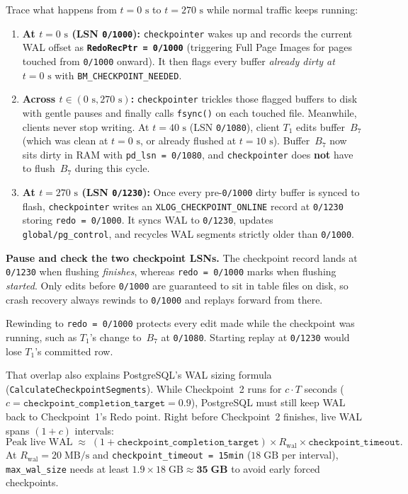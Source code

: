 Trace what happens from $t = 0\text{ s}$ to $t = 270\text{ s}$ while normal traffic keeps running:
\begin{enumerate}
  \item \textbf{At $t = 0\text{ s}$ (LSN \texttt{0/1000}):} \texttt{checkpointer} wakes up and records the current WAL offset as \textbf{\texttt{RedoRecPtr = 0/1000}} (triggering Full Page Images for pages touched from \texttt{0/1000} onward). It then flags every buffer \emph{already dirty at $t = 0\text{ s}$} with \texttt{BM\_CHECKPOINT\_NEEDED}.
  \item \textbf{Across $t \in (0\text{ s}, 270\text{ s})$:} \texttt{checkpointer} trickles those flagged buffers to disk with gentle pauses and finally calls \texttt{fsync()} on each touched file. Meanwhile, clients never stop writing. At $t = 40\text{ s}$ (LSN \texttt{0/1080}), client $T_1$ edits buffer~$B_7$ (which was clean at $t = 0\text{ s}$, or already flushed at $t = 10\text{ s}$). Buffer~$B_7$ now sits dirty in RAM with \texttt{pd\_lsn = 0/1080}, and \texttt{checkpointer} does \textbf{not} have to flush~$B_7$ during this cycle.
  \item \textbf{At $t = 270\text{ s}$ (LSN \texttt{0/1230}):} Once every pre-\texttt{0/1000} dirty buffer is synced to flash, \texttt{checkpointer} writes an \texttt{XLOG\_CHECKPOINT\_ONLINE} record at \texttt{0/1230} storing \texttt{redo = 0/1000}. It syncs WAL to \texttt{0/1230}, updates \texttt{global/pg\_control}, and recycles WAL segments strictly older than \texttt{0/1000}.
\end{enumerate}

\begin{recoverybox}
\textbf{Pause and check the two checkpoint LSNs.} The checkpoint record lands at \texttt{0/1230} when flushing \emph{finishes}, whereas \texttt{redo = 0/1000} marks when flushing \emph{started}. Only edits before \texttt{0/1000} are guaranteed to sit in table files on disk, so crash recovery always rewinds to \texttt{0/1000} and replays forward from there.
\end{recoverybox}

\begin{whybox}
Rewinding to \texttt{redo = 0/1000} protects every edit made while the checkpoint was running, such as $T_1$'s change to~$B_7$ at \texttt{0/1080}. Starting replay at \texttt{0/1230} would lose $T_1$'s committed row.

That overlap also explains PostgreSQL's WAL sizing formula (\texttt{CalculateCheckpointSegments}). While Checkpoint~2 runs for $c \cdot T$ seconds ($c = \texttt{checkpoint\_completion\_target} = 0.9$), PostgreSQL must still keep WAL back to Checkpoint~1's Redo point. Right before Checkpoint~2 finishes, live WAL spans $(1 + c)$ intervals:
\[
  \text{Peak live WAL} \;\approx\; (1 + \texttt{checkpoint\_completion\_target}) \times R_{\text{wal}} \times \texttt{checkpoint\_timeout}.
\]
At $R_{\text{wal}} = 20\;\text{MB/s}$ and \texttt{checkpoint\_timeout = 15min} ($18\;\text{GB}$ per interval), \texttt{max\_wal\_size} needs at least $1.9 \times 18\;\text{GB} \approx \mathbf{35\;\text{GB}}$ to avoid early forced checkpoints.
\end{whybox}

